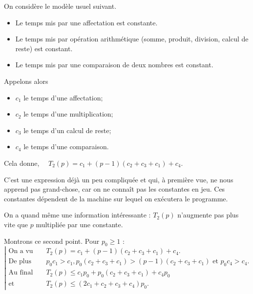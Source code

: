 On considère le modèle usuel suivant.

\begin{itemize}
\item[\textbullet] Le temps mis par une affectation est constante.
\item[\textbullet] Le temps mis par opération arithmétique (somme, produit,
  division, calcul de reste) est constant.
\item[\textbullet] Le temps mis par une comparaison de deux nombres est constant.
\end{itemize}

Appelons alors
\begin{itemize}
\item[\textbullet] $c_{1}$ le temps d'une affectation;
\item[\textbullet] $c_{2}$ le temps d'une multiplication;
\item[\textbullet] $c_{3}$ le temps d'un calcul de reste;
\item[\textbullet] $c_{4}$ le temps d'une comparaison.
\end{itemize}

Cela donne,
$ \quad   T_{2}(p) = c_{1} + (p-1) (c_{2} + c_{3} + c_{1}) + c_{4}$.


C'est une expression déjà un peu compliquée et qui, à première vue,  ne nous apprend pas grand-chose, car on ne  connaît pas les constantes en jeu.
Ces constantes dépendent de la machine sur lequel on  exécutera le programme. 

On a quand même une information intéressante : $T_{2}(p)$ n'augmente pas plus vite que $p$ multipliée par une constante.

%
%  
  
Montrons ce second point. Pour $p_0\geq 1$ : 
$ \left |\begin{array}{ll}
\text{On a vu que } & T_{2}(p) = c_{1} + (p-1) (c_{2} + c_{3} + c_{1}) + c_{4}. \\
\text{De plus} & p_0c_{1}> c_{1}, p_0 (c_{2} + c_{3} + c_{1}) > (p-1) (c_{2} + c_{3} + c_{1}) \text{ et  } p_0c_{4}>c_4. \\
\text{Au final }&    T_{2}(p) \leq c_{1}p_0 + p_0(c_{2}+c_{3}+c_{1})+c_{4}p_0\\
\text{et }  & T_{2}(p)\leq (2c_{1}+c_{2}+c_{3}+c_{4})p_0.
  \end{array}\right.$
  


